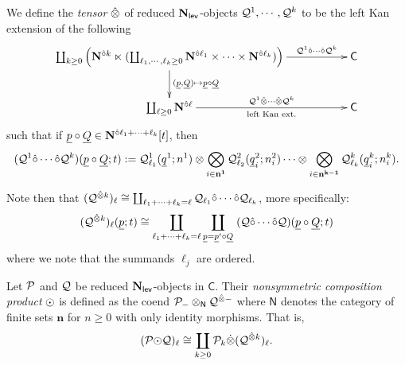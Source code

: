 \begin{definition} \label{def:tensor} We define the \textit{tensor $\hat{\otimes}$} of reduced $\mathbf{N}_{\mathsf{lev}}$-objects $\mathcal{Q}^1,\cdots,\mathcal{Q}^k$ to be the left Kan extension of the following \begin{equation} \xymatrix{ 
    \coprod_{k\geq 0} \left( \Ncirc{k} \ltimes (\coprod_{\ell_1,\cdots,\ell_k\geq 0}\Ncirc{\ell_1} \times \cdots \times \Ncirc{\ell_k}) \right) \ar[rr]^-{\Cal{Q}^1 \circhat \cdots \circhat \Cal{Q}^k} \ar[d]^-{(\underline{p}, \underline{Q}) \mapsto \underline{p} \circ \underline{Q}} 
    && \mathsf{C} 
    \\ \coprod_{\ell\geq 0} \mathbf{N}^{\circhat \ell} \ar[rr]^-{\Cal{Q}^1 \tensorhat \cdots \tensorhat \Cal{Q}^k}_-{\text{left Kan ext.}} 
    && \mathsf{C} }\end{equation}
such that if $\underline{p}\circ \underline{Q}\in \mathbf{N}^{\hat{\circ}\ell_1+\cdots+\ell_k}[t]$, then \[  (\mathcal{Q}^1 \hat{\circ} \cdots \hat{\circ} \mathcal{Q}^k)(\underline{p}\circ \underline{Q}; t) :=  \mathcal{Q}_{\ell_1}^1 (\underline{q}^1;n^1) \otimes \bigotimes_{i\in \mathbf{n^1}} \mathcal{Q}_{\ell_2}^{2}(\underline{q}^2_i;n^2_i) \cdots \otimes \bigotimes_{i\in\mathbf{n^{k-1}}} \mathcal{Q}^k_{\ell_k}(\underline{q}^k_i;n^k_i) . \]
\end{definition}

Note then that $(\mathcal{Q}^{\hat{\otimes} k})_{\ell} \cong \coprod_{\ell_1+\dots+\ell_k=\ell} \mathcal{Q}_{\ell_1} \hat{\circ} \cdots \hat{\circ} \mathcal{Q}_{\ell_k}$, more specifically: \begin{equation}
   (\mathcal{Q}^{\hat{\otimes} k})_{\ell}(\underline{p};t) \cong \coprod_{\ell_1+\dots+\ell_k=\ell} \coprod_{\underline{p}=\underline{p}' \circ \underline{Q}} \; (\mathcal{Q} \hat{\circ} \cdots \hat{\circ} \mathcal{Q})(\underline{p}\circ \underline{Q}; t)
    \end{equation}
where we note that the summands $\ell_j$ are ordered.

\begin{definition} \label{ccp} 
Let $\mathcal{P}$ and $\mathcal{Q}$ be reduced $\mathbf{N}_{\mathsf{lev}}$-objects in $\mathsf{C}$. Their \textit{nonsymmetric composition product} ${\odot}$ is defined as the coend $\mathcal{P}_{-} \otimes_{\mathsf{N}} \mathcal{Q}^{\hat{\otimes} -}$ where $\mathsf{N}$ denotes the category of finite sets $\mathbf{n}$ for $n\geq 0$ with only identity morphisms. That is, \[(\mathcal{P}{\odot} \mathcal{Q})_{\ell}\cong \coprod_{k\geq 0} \mathcal{P}_k \dot{\otimes} (\mathcal{Q}^{\hat{\otimes} k})_{\ell}.
\]
\end{definition}

